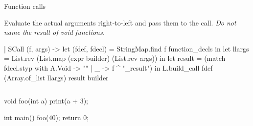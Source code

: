 \documentclass{plt}
\begin{document}
\begin{frame}[fragile=singleslide]{Function calls}

Evaluate the actual arguments right-to-left and pass them to the call.
\emph{Do not name the result of \emph{void} functions.}

\begin{ocaml}
| SCall (f, args) ->
   let (fdef, fdecl) = StringMap.find f function_decls in
   let llargs = List.rev (List.map (expr builder) (List.rev args)) in
   let result = (match fdecl.styp with 
                  A.Void -> ""
                | _ -> f ^ "_result") in
   L.build_call fdef (Array.of_list llargs) result builder
\end{ocaml}

\vspace{-4pt}

\begin{columns}
\begin{column}{0.25\textwidth}
\begin{C}
void foo(int a)
{
  print(a + 3);
}

int main()
{
  foo(40);
  return 0;
}
\end{C}
\end{column}
\begin{column}{0.75\textwidth}
\end{column}
\end{columns}

\end{frame}
\end{document}
